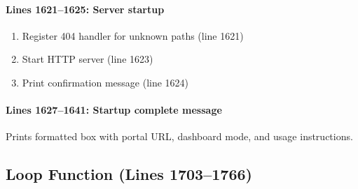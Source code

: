 \documentclass[11pt,a4paper]{article}
\begin{document}
\paragraph{Lines 1621--1625: Server startup}
\begin{enumerate}[leftmargin=*]
  \item Register 404 handler for unknown paths (line 1621)
  \item Start HTTP server (line 1623)
  \item Print confirmation message (line 1624)
\end{enumerate}

\paragraph{Lines 1627--1641: Startup complete message}
Prints formatted box with portal URL, dashboard mode, and usage instructions.

\subsection{Loop Function (Lines 1703--1766)}
\end{document}
